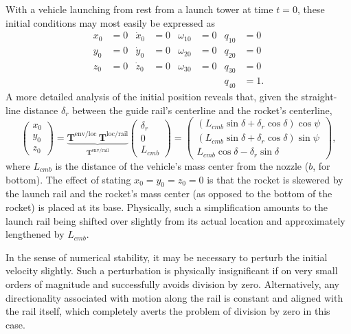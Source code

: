 \documentclass[11pt,dvipsnames]{thesis}
\begin{document}
With a vehicle launching from rest from a launch tower at time $t = 0$, these initial conditions may most easily be expressed as
\begin{align}
x_0 &= 0 & \dot{x}_0 &= 0 & \omega_{10} &= 0 & q_{10} &= 0\\
y_0 &= 0 & \dot{y}_0 &= 0 & \omega_{20} &= 0 & q_{20} &= 0\\
z_0 &= 0 & \dot{z}_0 &= 0 & \omega_{30} &= 0 & q_{30} &= 0\\
    &    &           &    &             &    & q_{40} &= 1.
\end{align}
A more detailed analysis of the initial position reveals that, given the straight-line distance $\delta_r$ between the guide rail's centerline and the rocket's centerline,  
\begin{equation}
\begin{pmatrix}x_0 \\ y_0 \\ z_0\end{pmatrix} = \underbrace{\mathbf{T}^{\text{env}/\text{loc}}\, \mathbf{T}^{\text{loc}/\text{rail}}}_{\mathbf{T}^{\text{env}/\text{rail}}} \begin{pmatrix}\delta_r \\ 0 \\ L_{cmb}\end{pmatrix} = \begin{pmatrix}(L_{cmb}\sin\delta + \delta_r\cos\delta)\cos\psi \\ (L_{cmb}\sin\delta + \delta_r\cos\delta)\sin\psi \\ L_{cmb}\cos\delta - \delta_r\sin\delta\end{pmatrix},
\end{equation}
where $L_{cmb}$ is the distance of the vehicle's mass center from the nozzle ($b$, for bottom). The effect of stating $x_0 = y_0 = z_0 = 0$ is that the rocket is skewered by the launch rail and the rocket's mass center (as opposed to the bottom of the rocket) is placed at its base. Physically, such a simplification amounts to the launch rail being shifted over slightly from its actual location and approximately lengthened by $L_{cmb}$.

In the sense of numerical stability, it may be necessary to perturb the initial velocity slightly. Such a perturbation is physically insignificant if on very small orders of magnitude and successfully avoids division by zero. Alternatively, any directionality associated with motion along the rail is constant and aligned with the rail itself, which completely averts the problem of division by zero in this case.
\end{document}
